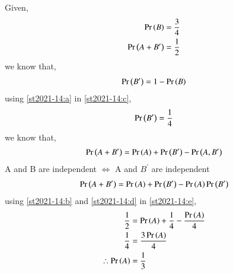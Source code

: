 

Given,
\begin{align}
\Pr\left(B\right)=\frac{3}{4}\label{st2021-14:a}\\
\Pr\left(A + B^{\prime}\right) =\frac{1}{2} \label{st2021-14:b}
\end{align}
we know that,
\begin{align}
\Pr\left(B^{\prime}\right) = 1-\Pr\left(B\right) \label{st2021-14:c}
\end{align}
using \eqref{st2021-14:a} in \eqref{st2021-14:c},
\begin{align}
\Pr\left(B^{\prime}\right) = \frac{1}{4} \label{st2021-14:d}
\end{align}
we know that,
\begin{align}
\Pr\left(A + B^{\prime}\right) = \Pr\left(A\right) +\Pr\left(B^{\prime}\right) - \Pr\left(A,B^{\prime}\right)
\end{align}
A and B are independent $\iff$ A and $B^{\prime}$ are independent
\begin{align}
\Pr\left(A + B^{\prime}\right) = \Pr\left(A\right) +\Pr\left(B^{\prime}\right) - \Pr\left(A\right)\Pr\left(B^{\prime}\right) \label{st2021-14:e}
\end{align}
using \eqref{st2021-14:b}  and \eqref{st2021-14:d} in \eqref{st2021-14:e},
\begin{align}
\frac{1}{2} &= \Pr\left(A\right) + \frac{1}{4} - \frac{\Pr\left(A\right)}{4}\\
\frac{1}{4} &= \frac{3\Pr\left(A\right)}{4}\\
\therefore \Pr\left(A\right) &= \frac{1}{3}
\end{align}
